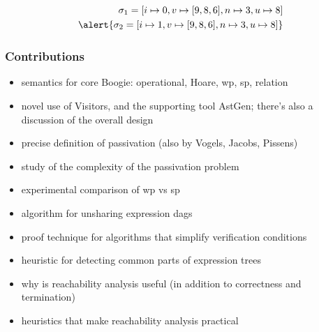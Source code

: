 \documentclass{beamer}
\begin{document}
\begin{frame}
\begin{align*}
  \sigma_1=[i\mapsto0,v\mapsto[9,8,6],n\mapsto3,u\mapsto8]
\\
  \alert{\sigma_2=[i\mapsto1,v\mapsto[9,8,6],n\mapsto3,u\mapsto8]}
\end{align*}
\begin{center}
\end{center}
\end{frame}


\begin{frame}
  \frametitle{Contributions}
  \begin{itemize}
  \item semantics for core Boogie: operational, Hoare, wp, sp, relation
  \item novel use of Visitors, and the supporting tool AstGen; there's
    also a discussion of the overall design
  \item precise definition of passivation (also by Vogels, Jacobs, Pissens)
  \item study of the complexity of the passivation problem
  \item experimental comparison of wp vs sp
  \item algorithm for unsharing expression dags
  \item proof technique for algorithms that simplify verification conditions
  \item heuristic for detecting common parts of expression trees
  \item why is reachability analysis useful (in addition to correctness
    and termination)
  \item heuristics that make reachability analysis practical 
  \end{itemize}
\end{frame}
\end{document}
